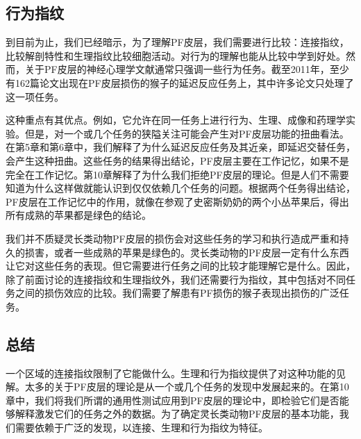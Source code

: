 \subsection{行为指纹}
到目前为止，我们已经暗示，为了理解PF皮层，我们需要进行比较：连接指纹，比较解剖特性和生理指纹比较细胞活动。对行为的理解也能从比较中学到好处。然而，关于PF皮层的神经心理学文献通常只强调一些行为任务。截至2011年，至少有162篇论文出现在PF皮层损伤的猴子的延迟反应任务上，其中许多论文只处理了这一项任务。
\par
这种重点有其优点。例如，它允许在同一任务上进行行为、生理、成像和药理学实验。但是，对一个或几个任务的狭隘关注可能会产生对PF皮层功能的扭曲看法。在第5章和第6章中，我们解释了为什么延迟反应任务及其近亲，即延迟交替任务，会产生这种扭曲。这些任务的结果得出结论，PF皮层主要在工作记忆，如果不是完全在工作记忆。第10章解释了为什么我们拒绝PF皮层的理论。但是人们不需要知道为什么这样做就能认识到仅仅依赖几个任务的问题。根据两个任务得出结论，PF皮层在工作记忆中的作用，就像在参观了史密斯奶奶的两个小丛苹果后，得出所有成熟的苹果都是绿色的结论。
\par
我们并不质疑灵长类动物PF皮层的损伤会对这些任务的学习和执行造成严重和持久的损害，或者一些成熟的苹果是绿色的。灵长类动物的PF皮层一定有什么东西让它对这些任务的表现。但它需要进行任务之间的比较才能理解它是什么。因此，除了前面讨论的连接指纹和生理指纹外，我们还需要行为指纹，其中包括对不同任务之间的损伤效应的比较。我们需要了解患有PF损伤的猴子表现出损伤的广泛任务。

\subsection{总结}
一个区域的连接指纹限制了它能做什么。生理和行为指纹提供了对这种功能的见解。太多的关于PF皮层的理论是从一个或几个任务的发现中发展起来的。在第10章中，我们将我们所谓的通用性测试应用到PF皮层的理论中，即检验它们是否能够解释激发它们的任务之外的数据。为了确定灵长类动物PF皮层的基本功能，我们需要依赖于广泛的发现，以连接、生理和行为指纹为特征。

